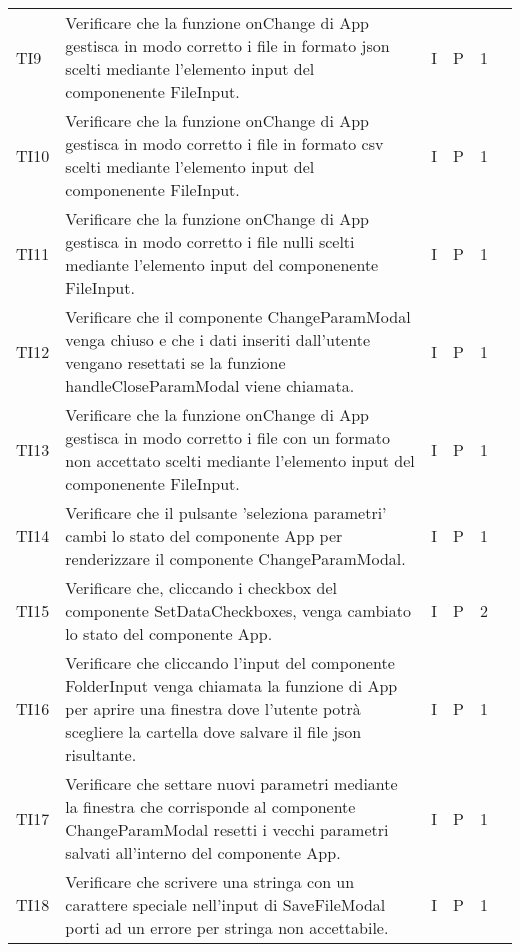 \begin{longtable} {
		>{}p{12mm}
		>{}p{79.5mm}
		>{}p{9mm}
		>{}p{8mm}
		>{}p{14mm}
		>{}p{0mm}}
    TI9      &  Verificare che la funzione onChange di App gestisca in modo corretto i file in formato json scelti mediante l'elemento input del componenente FileInput. & I & P  & 1 & \TBstrut \\ [2mm]
    TI10     &  Verificare che la funzione onChange di App gestisca in modo corretto i file in formato csv scelti mediante l'elemento input del componenente FileInput. & I & P  & 1 & \TBstrut \\ [2mm]
    TI11     &  Verificare che la funzione onChange di App gestisca in modo corretto i file nulli scelti mediante l'elemento input del componenente FileInput. & I & P  & 1 & \TBstrut \\ [2mm]
    TI12     &  Verificare che il componente ChangeParamModal venga chiuso e che i dati inseriti dall'utente vengano resettati se la funzione handleCloseParamModal viene chiamata. & I & P  & 1 & \TBstrut \\ [2mm]
    TI13     &  Verificare che la funzione onChange di App gestisca in modo corretto i file con un formato non accettato scelti mediante l'elemento input del componenente FileInput. & I & P  & 1 & \TBstrut \\ [2mm]
    TI14     &  Verificare che il pulsante 'seleziona parametri' cambi lo stato del componente App per renderizzare il componente ChangeParamModal. & I & P  & 1 & \TBstrut \\ [2mm]
    TI15     &  Verificare che, cliccando i checkbox del componente SetDataCheckboxes, venga cambiato lo stato del componente App. & I & P  & 2 & \TBstrut \\ [2mm]
    TI16     &  Verificare che cliccando l'input del componente FolderInput venga chiamata la funzione di App per aprire una finestra dove l'utente potrà scegliere la cartella dove salvare il file json risultante. & I & P  & 1 & \TBstrut \\ [2mm]
    TI17     &  Verificare che settare nuovi parametri mediante la finestra che corrisponde al componente ChangeParamModal resetti i vecchi parametri salvati all'interno del componente App. & I & P  & 1 & \TBstrut \\ [2mm]
    TI18     &  Verificare che scrivere una stringa con un carattere speciale nell'input di SaveFileModal porti ad un errore per stringa non accettabile. & I & P  & 1 & \TBstrut \\ [2mm]


\end{longtable}
